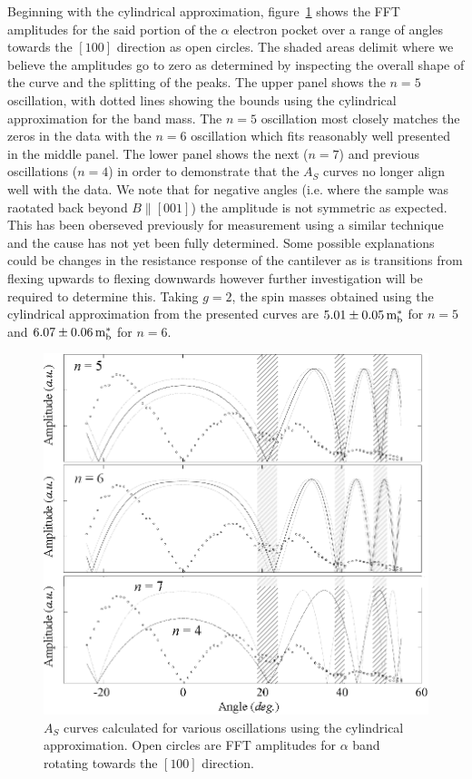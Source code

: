 Beginning with the cylindrical approximation, figure~\ref{Fig:ResD:Band4SpinMassCylindrical} shows the \ac{FFT} amplitudes for the said portion of the $\alpha$ electron pocket over a range of angles towards the $[100]$ direction as open circles. The shaded areas delimit where we believe the amplitudes go to zero as determined by inspecting the overall shape of the curve and the splitting of the peaks. The upper panel shows the $n=5$ oscillation, with dotted lines showing the bounds using the cylindrical approximation for the band mass. The $n=5$ oscillation most closely matches the zeros in the data with the $n=6$ oscillation which fits reasonably well presented in the middle panel. The lower panel shows the next ($n=7$) and previous oscillations ($n=4$) in order to demonstrate that the $A_S$ curves no longer align well with the data. We note that for negative angles (i.e. where the sample was raotated back beyond $B\parallel[001]$) the amplitude is not symmetric as expected. This has been oberseved previously for measurement using a similar technique\cite{Rourke2010b} and the cause has not yet been fully determined. Some possible explanations could be changes in the resistance response of the cantilever as is transitions from flexing upwards to flexing downwards however further investigation will be required to determine this. Taking $g=2$, the spin masses obtained using the cylindrical approximation from the presented curves are $\unit[5.01\pm0.05]{m^*_b}$ for $n=5$ and $\unit[6.07\pm0.06]{m^*_b}$ for $n=6$.
\begin{figure}[htbp]
    \begin{center}
        \includegraphics[scale=0.75]{Chapter-dHvABaFe2P2/Figures/Mass/SpinMassBand4Cylindrical/SpinMassBand4Cylindrical}
        \caption{$A_S$ curves calculated for various oscillations using the cylindrical approximation. Open circles are \ac{FFT} amplitudes for $\alpha$ band rotating towards the $[100]$ direction.}
        \label{Fig:ResD:Band4SpinMassCylindrical}
    \end{center}
\end{figure}
